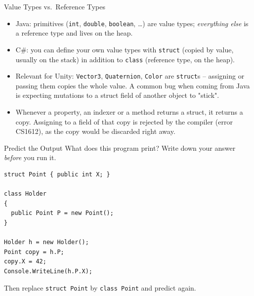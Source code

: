 \begin{frame}{Value Types vs.\ Reference Types}
  \begin{itemize}
    \item Java: primitives (\texttt{int}, \texttt{double}, \texttt{boolean},
      \ldots) are value types; \emph{everything else} is a reference type
      and lives on the heap.
    \item C\#: you can define your own value types with \texttt{struct}
      (copied by value, usually on the stack) in addition to
      \texttt{class} (reference type, on the heap).
    \item Relevant for Unity: \texttt{Vector3}, \texttt{Quaternion},
      \texttt{Color} are \texttt{struct}s -- assigning or passing them
      copies the whole value. A common bug when coming from Java is
      expecting mutations to a struct field of another object to
      "stick".
    \item Whenever a property, an indexer or a method returns a struct, it
      returns a copy. Assigning to a field of that copy is rejected by the
      compiler (error CS1612), as the copy would be discarded right away.
  \end{itemize}
\end{frame}

\begin{exerciseframe}{Predict the Output}
  What does this program print? Write down your answer \emph{before} you run it.
  \vspace{1ex}

  \begin{lstlisting}[basicstyle=\scriptsize\ttfamily]
struct Point { public int X; }

class Holder
{
  public Point P = new Point();
}

Holder h = new Holder();
Point copy = h.P;
copy.X = 42;
Console.WriteLine(h.P.X);
  \end{lstlisting}
  \vspace{1ex}

  Then replace \texttt{struct Point} by \texttt{class Point} and predict again.
\end{exerciseframe}


